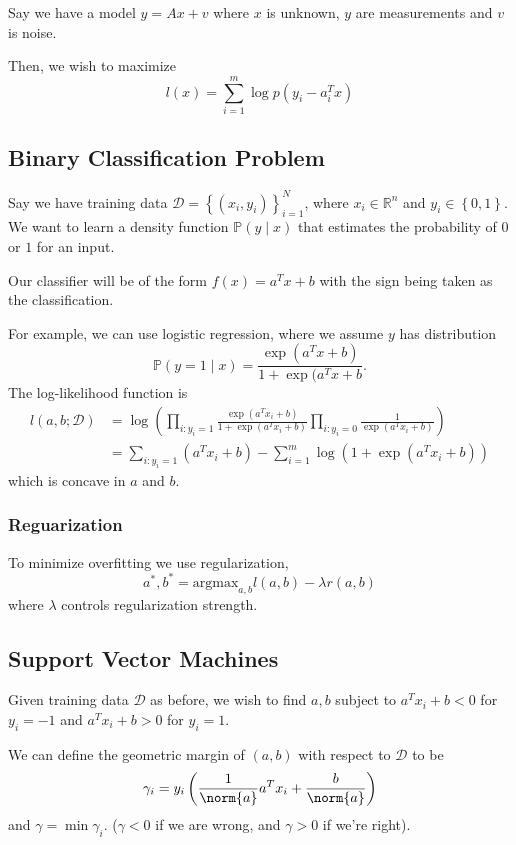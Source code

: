 \documentclass[11pt]{article}
\begin{document}
Say we have a model $y = Ax + v$ where $x$ is unknown, $y$ are measurements and $v$ is noise. \par
Then, we wish to maximize 
\[ l(x) = \sum_{i=1}^m \log p(y_i - a_i^Tx) \] 

\subsection{Binary Classification Problem} 
Say we have training data $\mathcal{D} = \left\{ (x_i, y_i) \right\}_{i=1}^N$, where $x_i \in \mathbb{R}^n$ and $y_i \in \left\{ 0, 1 \right\}$. We want to learn a density function $\mathbb{P}(y \mid x)$ that estimates the probability of $0$ or $1$ for an input. \par 
Our classifier will be of the form $f(x) = a^Tx + b$ with the sign being taken as the classification. \par 

For example, we can use logistic regression, where we assume $y$ has distribution 
\[ \mathbb{P}(y = 1 \mid x) = \frac{\exp(a^Tx + b)}{1 + \exp(a^Tx + b}. \] 
The log-likelihood function is 
\begin{align*}
    l(a, b; \mathcal{D}) &= \log \left( \prod_{i:y_i=1} \frac{\exp(a^Tx_i + b)}{1 + \exp(a^Tx_i + b)} \prod_{i:y_i=0} \frac{1}{\exp(a^Tx_i + b)} \right) \\
    &= \sum_{i:y_i=1} (a^Tx_i + b) - \sum_{i=1}^m \log (1 + \exp(a^Tx_i + b))
\end{align*}
which is concave in $a$ and $b$. \par 

\subsubsection*{Reguarization}
To minimize overfitting we use regularization, 
\[ a^*, b^* = \mathrm{argmax}_{a, b} l(a, b) - \lambda r(a, b) \] 
where $\lambda$ controls regularization strength. 

\subsection{Support Vector Machines} 
Given training data $\mathcal{D}$ as before, we wish to find $a,  b$ subject to $a^Tx_i + b < 0$ for $y_i = -1$ and $a^Tx_i + b > 0$ for $y_i = 1$. \par

We can define the geometric margin of $(a, b)$ with respect to $\mathcal{D}$ to be 
\[ \gamma_i = y_i \left( \frac{1}{\norm{a}}a^Tx_i + \frac{b}{\norm{a}} \right) \] 
and $\gamma = \min \gamma_i$. ($\gamma < 0$ if we are wrong, and $\gamma > 0$ if we're right). \par
\end{document}
